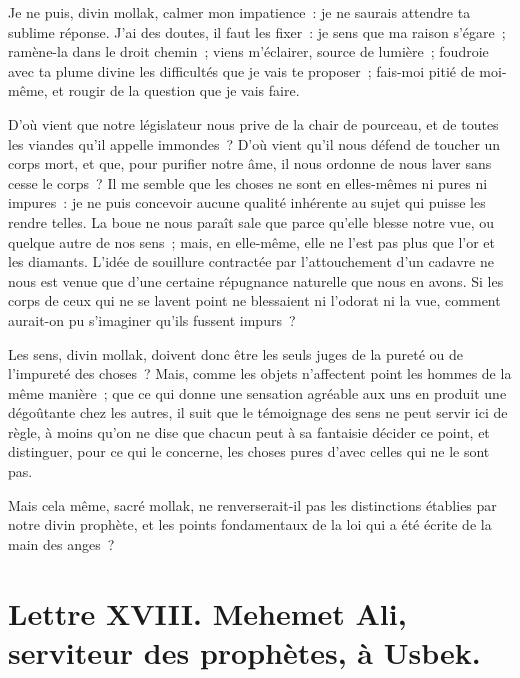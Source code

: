 \documentclass[french,twoside]{book} %
\newcommand{\dateline}[1]{\medskip{\RaggedLeft{#1}\par}\bigskip}
\begin{document}
\noindent Je ne puis, divin mollak, calmer mon impatience : je ne saurais attendre ta sublime réponse. J’ai des doutes, il faut les fixer : je sens que ma raison s’égare ; ramène-la dans le droit chemin ; viens m’éclairer, source de lumière ; foudroie avec ta plume divine les difficultés que je vais te proposer ; fais-moi pitié de moi-même, et rougir de la question que je vais faire.\par
D’où vient que notre législateur nous prive de la chair de pourceau, et de toutes les viandes qu’il appelle immondes ? D’où vient qu’il nous défend de toucher un corps mort, et que, pour purifier notre âme, il nous ordonne de nous laver sans cesse le corps ? Il me semble que les choses ne sont en elles-mêmes ni pures ni impures : je ne puis concevoir aucune qualité inhérente au sujet qui puisse les rendre telles. La boue ne nous paraît sale que parce qu’elle blesse notre vue, ou quelque autre de nos sens ; mais, en elle-même, elle ne l’est pas plus que l’or et les diamants. L’idée de souillure contractée par l’attouchement d’un cadavre ne nous est venue que d’une certaine répugnance naturelle que nous en avons. Si les corps de ceux qui ne se lavent point ne blessaient ni l’odorat ni la vue, comment aurait-on pu s’imaginer qu’ils fussent impurs ?\par
Les sens, divin mollak, doivent donc être les seuls juges de la pureté ou de l’impureté des choses ? Mais, comme les objets n’affectent point les hommes de la même manière ; que ce qui donne une sensation agréable aux uns en produit une dégoûtante chez les autres, il suit que le témoignage des sens ne peut servir ici de règle, à moins qu’on ne dise que chacun peut à sa fantaisie décider ce point, et distinguer, pour ce qui le concerne, les choses pures d’avec celles qui ne le sont pas.\par
Mais cela même, sacré mollak, ne renverserait-il pas les distinctions établies par notre divin prophète, et les points fondamentaux de la loi qui a été écrite de la main des anges ?\par

\dateline{D’Erzeron, le 20 de la lune de Gemmadi 2, 1711}
\section[{Lettre XVIII. Mehemet Ali, serviteur des prophètes, à Usbek.}]{Lettre XVIII. Mehemet Ali, serviteur des prophètes, à Usbek.}\renewcommand{\leftmark}{Lettre XVIII. Mehemet Ali, serviteur des prophètes, à Usbek.}
\end{document}
